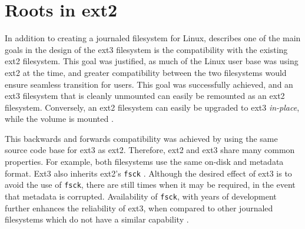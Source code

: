 \section{Roots in ext2}

In addition to creating a journaled filesystem for Linux, \citet{Tweedie2000} describes one of the main goals in the design of the ext3 filesystem is the compatibility with the existing ext2 filesystem. This goal was justified, as much of the Linux user base was using ext2 at the time, and greater compatibility between the two filesystems would ensure seamless transition for users. This goal was successfully achieved, and an ext3 filesystem that is cleanly unmounted can easily be remounted as an ext2 filesystem. Conversely, an ext2 filesystem can easily be upgraded to ext3 \emph{in-place}, while the volume is mounted \citep{Tweedie2000, Robbins2001a, Bovet2006}.

This backwards and forwards compatibility was achieved by using the same source code base for ext3 as ext2. Therefore, ext2 and ext3 share many common properties. For example, both filesystems use the same on-disk and metadata format. Ext3 also inherits ext2's \texttt{fsck} \citep{Robbins2001a, Tweedie2000}. Although the desired effect of ext3 is to avoid the use of \texttt{fsck}, there are still times when it may be required, in the event that metadata is corrupted. Availability of \texttt{fsck}, with years of development further enhances the reliability of ext3, when compared to other journaled filesystems which do not have a similar capability \citep{Robbins2001a}.